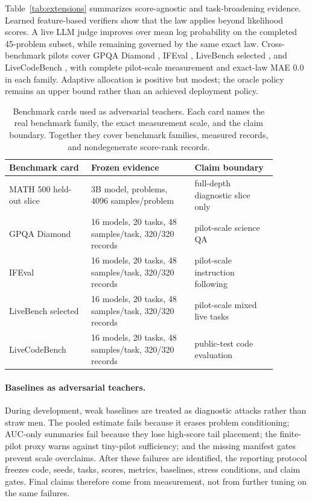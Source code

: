 \documentclass{article}
\begin{document}
Table~\ref{tab:extensions} summarizes score-agnostic and task-broadening
evidence. Learned feature-based verifiers show that the law applies beyond
likelihood scores. A live LLM judge improves over mean log probability on the
completed 45-problem subset, while remaining governed by the same exact law.
Cross-benchmark pilots cover GPQA Diamond \citep{rein2023gpqa}, IFEval
\citep{zhou2023ifeval}, LiveBench selected \citep{white2024livebench}, and
LiveCodeBench \citep{jain2024livecodebench}, with complete pilot-scale
measurement and exact-law MAE 0.0 in each family. Adaptive allocation is
positive but modest; the oracle policy remains an upper bound rather than an
achieved deployment policy.

\begin{table}[t]
\centering
\caption{Benchmark cards used as adversarial teachers. Each card names the
real benchmark family, the exact measurement scale, and the claim boundary.
Together they cover \EvidenceBenchmarkCards{} benchmark families,
\EvidenceBenchmarkCardRecords{} measured records, and
\EvidenceBenchmarkCardNondegenerate{} nondegenerate score-rank records.}
\label{tab:benchmark-cards}
\begin{tabular}{L{0.27\linewidth}L{0.34\linewidth}L{0.27\linewidth}}
\toprule
Benchmark card & Frozen evidence & Claim boundary \\
\midrule
MATH 500 held-out slice & 3B model, \EvidenceHeldoutRecords{} problems,
4096 samples/problem & full-depth diagnostic slice only \\
GPQA Diamond & 16 models, 20 tasks, 48 samples/task, 320/320 records &
pilot-scale science QA \\
IFEval & 16 models, 20 tasks, 48 samples/task, 320/320 records &
pilot-scale instruction following \\
LiveBench selected & 16 models, 20 tasks, 48 samples/task, 320/320 records &
pilot-scale mixed live tasks \\
LiveCodeBench & 16 models, 20 tasks, 48 samples/task, 320/320 records &
public-test code evaluation \\
\bottomrule
\end{tabular}
\end{table}

\paragraph{Baselines as adversarial teachers.}
During development, weak baselines are treated as diagnostic attacks rather
than straw men. The pooled estimate fails because it erases problem
conditioning; AUC-only summaries fail because they lose high-score tail
placement; the finite-pilot proxy warns against tiny-pilot sufficiency; and
the missing manifest gates prevent scale overclaims. After these failures are
identified, the reporting protocol freezes code, seeds, tasks, scores, metrics,
baselines, stress conditions, and claim gates. Final claims therefore come from
measurement, not from further tuning on the same failures.
\end{document}
